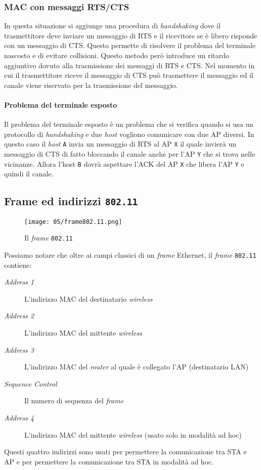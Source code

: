         \subsubsection{\Acrshort*{MAC} con messaggi \Acrshort*{RTS}/\Acrshort*{CTS}}
            In questa situazione si aggiunge una procedura di \textit{handshaking} dove il trasmettitore deve inviare un messaggio di \acrfull*{RTS} e il ricevitore se è libero risponde con un messaggio di \acrfull*{CTS}. Questo permette di risolvere il problema del terminale nascosto e di evitare collisioni. Questo metodo però introduce un ritardo aggiuntivo dovuto alla trasmissione dei messaggi di \Acrshort*{RTS} e \Acrshort*{CTS}. Nel momento in cui il trasmettitore riceve il messaggio di \Acrshort*{CTS} può trasmettere il messaggio ed il canale viene riservato per la trasmissione del messaggio.
            \paragraph{Problema del terminale esposto} Il problema del terminale esposto è un problema che si verifica quando si usa un protocollo di \textit{handshaking} e due \textit{host} vogliono comunicare con due \Acrshort*{AP} diversi. In questo caso il \textit{host} \texttt{A} invia un messaggio di \Acrshort*{RTS} al \Acrshort*{AP} \texttt{X} il quale invierà un messaggio di \Acrshort*{CTS} di fatto bloccando il canale anche per l'\Acrshort*{AP} \texttt{Y} che si trova nelle vicinanze. Allora l'host \texttt{B} dovrà aspettare l'\Acrshort*{ACK} del \Acrshort*{AP} \texttt{X} che libera l'\Acrshort*{AP} \texttt{Y} e quindi il canale.
    \subsection{Frame ed indirizzi \texttt{802.11}}
        \begin{figure}[H]
            \centering
            \texttt{[image: 05/frame802.11.png]}
            \caption{Il \textit{frame} \texttt{802.11}}
        \end{figure}
        Possiamo notare che oltre ai campi classici di un \textit{frame} Ethernet, il \textit{frame} \texttt{802.11} contiene:
        \begin{description}
            \item[\textit{Address 1}] L'indirizzo \Acrshort*{MAC} del destinatario \textit{wireless}
            \item[\textit{Address 2}] L'indirizzo \Acrshort*{MAC} del mittente \textit{wireless}
            \item[\textit{Address 3}] L'indirizzo \Acrshort*{MAC} del \textit{router} al quale è collegato l'\Acrshort*{AP} (destinatario \Acrshort*{LAN})
            \item[\textit{Sequence Control}] Il numero di sequenza del \textit{frame}
            \item[\textit{Address 4}] L'indirizzo \Acrshort*{MAC} del mittente \textit{wireless} (usato solo in modalità ad hoc)
        \end{description}
        Questi quattro indirizzi sono usati per permettere la comunicazione tra \Acrshort*{STA} e \Acrshort*{AP} e per permettere la comunicazione tra \Acrshort*{STA} in modalità ad hoc.